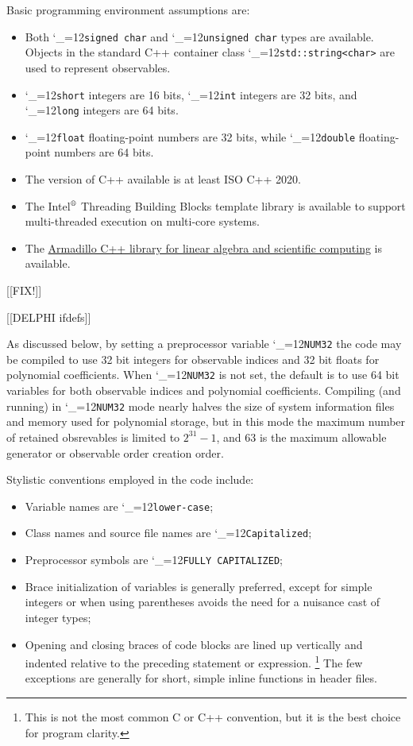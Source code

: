 \documentclass [12pt]{article}
\makeatletter
\renewcommand{\tt}{\begingroup\catcode`_=12\def\_{\string_}\tt@}
\newcommand{\tt@}[1]{\texttt{#1}\endgroup}
\makeatother
\begin{document}
Basic programming environment assumptions are:
\begin{itemize}\advance\itemsep -3pt
\item
    Both \tt{signed char} and \tt{unsigned char}
    types are available.
    Objects in the standard C++ container class
    \tt{std::string<char>} are used to
    represent observables.
\item
    \tt{short} integers are 16 bits,
    \tt{int} integers are 32 bits, and
    \tt{long} integers are 64 bits.
\item
    \tt{float} floating-point numbers are 32 bits, while
    \tt{double} floating-point numbers are 64 bits.
\item
    The version of C++ available is at least ISO C++ 2020.
\item
    The Intel$^{\text{\textregistered}}$ Threading Building Blocks template library
    \cite{IntelTBB}
    is available to support multi-threaded execution on multi-core systems.
\item
    The \href{https://arma.sourceforge.net}{Armadillo C++ library
    for linear algebra and scientific computing} is available.
\end{itemize}

[[FIX!]]

[[DELPHI ifdefs]]

As discussed below, by setting a preprocessor variable
\tt{NUM32} the code may be compiled to use 32 bit integers
for observable indices and 32 bit floats for polynomial coefficients.
When \tt{NUM32} is not set, the default is to use 64 bit
variables for both observable indices and polynomial coefficients.
Compiling (and running) in \tt{NUM32} mode nearly halves the size of
system information files and memory used for polynomial storage,
but in this mode the maximum number of retained obsrevables
is limited to $2^{31} - 1$, and 63 is the maximum allowable
generator or observable order creation order.

Stylistic conventions employed in the code include:
\begin{itemize}\advance\itemsep -3pt
\item
    Variable names are \tt{lower-case};
\item
    Class names and source file names are \tt{Capitalized};
\item
    Preprocessor symbols are \tt{FULLY CAPITALIZED};
\item
    Brace initialization of variables is generally preferred,
    except for simple integers or when using parentheses
    avoids the need for a nuisance cast of integer types;
\item
    Opening and closing braces of code blocks are lined up vertically
    and indented relative to the preceding statement or expression.%
    \footnote
	{
	This is not the most common C or C++ convention, but it is the best choice
	for program clarity.
	}
    The few exceptions are generally for short, simple inline functions in header files.
\end{itemize}
\end{document}
